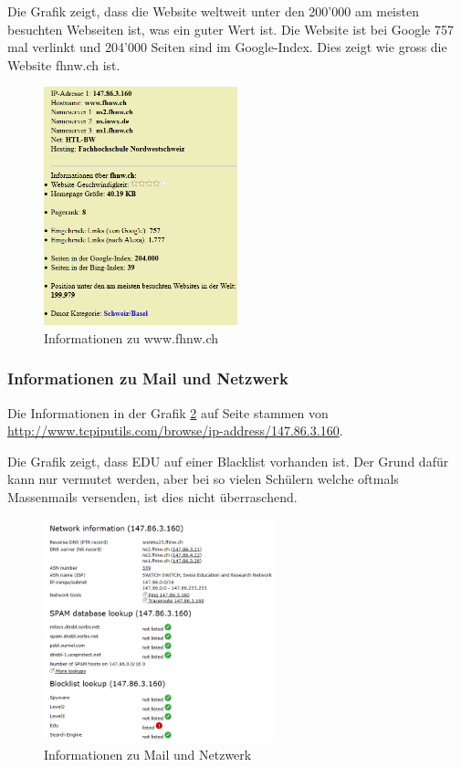 \documentclass[a4paper,11pt]{scrartcl}
\begin{document}
Die Grafik zeigt, dass die Website weltweit unter den 200'000 am meisten besuchten Webseiten ist, was ein guter Wert ist. Die Website ist bei Google 757 mal verlinkt und 204'000 Seiten sind im Google-Index. Dies zeigt wie gross die Website fhnw.ch ist.
\begin{figure}[h]
	\centering
	\includegraphics[width=0.5\textwidth]{../aufg5/website_infos.png}
	\caption{Informationen zu www.fhnw.ch}
	\label{fig:website_infos}
\end{figure}

\subsubsection{Informationen zu Mail und Netzwerk}
Die Informationen in der Grafik \ref{fig:iprange_infos} auf Seite \pageref{fig:iprange_infos} stammen von \url{http://www.tcpiputils.com/browse/ip-address/147.86.3.160}.

Die Grafik zeigt, dass EDU auf einer Blacklist vorhanden ist. Der Grund dafür kann nur vermutet werden, aber bei so vielen Schülern welche oftmals Massenmails versenden, ist dies nicht überraschend.
\begin{figure}[h]
	\centering
	\includegraphics[width=0.6\textwidth]{../aufg5/iprange_infos.png}
	\caption{Informationen zu Mail und Netzwerk}
	\label{fig:iprange_infos}
\end{figure}
\end{document}
